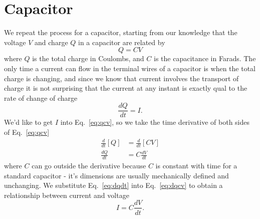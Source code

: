 \documentclass{tufte-handout}
\begin{document}
\section{Capacitor}
We repeat the process for a capacitor, starting from our knowledge that the voltage $V$ and charge $Q$ in a capacitor are related by
\begin{equation}
Q = CV
\label{eq:qcv}
\end{equation}
where $Q$ is the total charge in Coulombs, and $C$ is the capacitance in Farads. The only time a current can flow in the terminal wires of a capacitor is when the total charge is changing, and since we know that current involves the transport of charge it is not surprising that the current at any instant is exactly qual to the rate of change of charge
\begin{equation}
\frac{dQ}{dt} = I.
\label{eq:dqdt}
\end{equation}
We'd like to get $I$ into Eq.~\ref{eq:qcv}, so we take the time derivative of both sides of Eq.~\ref{eq:qcv}
\begin{align}
\frac{d}{dt}[Q]&=\frac{d}{dt}\left[ CV\right] \\
\frac{dQ}{dt}&=C\frac{dV}{dt} \label{eq:dqcv}
\end{align}
where $C$ can go outside the derivative because $C$ is constant with time for a standard capacitor - it's dimensions are usually mechanically defined and unchanging.
We substitute Eq.~\ref{eq:dqdt} into Eq.~\ref{eq:dqcv} to obtain a relationship between current and voltage
\begin{equation}
I = C\frac{dV}{dt}.
\end{equation}
\end{document}
